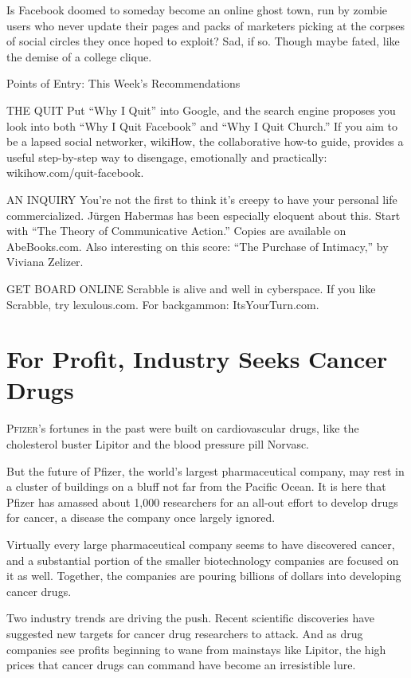 ﻿\documentclass[12pt]{article}
\begin{document}
Is Facebook doomed to someday become an online ghost town, run by zombie users who never update
their pages and packs of marketers picking at the corpses of social circles they once hoped to
exploit? Sad, if so. Though maybe fated, like the demise of a college clique.

Points of Entry: This Week's Recommendations

THE QUIT Put ``Why I Quit'' into Google, and the search engine proposes you look into both ``Why I
Quit Facebook'' and ``Why I Quit Church.'' If you aim to be a lapsed social networker, wikiHow, the
collaborative how-to guide, provides a useful step-by-step way to disengage, emotionally and
practically: wikihow.com/quit-facebook.

AN INQUIRY You're not the first to think it's creepy to have your personal life commercialized.
Jürgen Habermas has been especially eloquent about this. Start with ``The Theory of Communicative
Action.'' Copies are available on AbeBooks.com. Also interesting on this score: ``The Purchase of
Intimacy,'' by Viviana Zelizer.

GET BOARD ONLINE Scrabble is alive and well in cyberspace. If you like Scrabble, try lexulous.com.
For backgammon: ItsYourTurn.com.

\section{For Profit, Industry Seeks Cancer Drugs}

\lettrine{P}{fizer}'s fortunes in the past were built on cardiovascular drugs, like the cholesterol
buster Lipitor and the blood pressure pill Norvasc.

But the future of Pfizer, the world's largest pharmaceutical company, may rest in a cluster of
buildings on a bluff not far from the Pacific Ocean. It is here that Pfizer has amassed about 1,000
researchers for an all-out effort to develop drugs for cancer, a disease the company once largely
ignored.

Virtually every large pharmaceutical company seems to have discovered cancer, and a substantial
portion of the smaller biotechnology companies are focused on it as well. Together, the companies
are pouring billions of dollars into developing cancer drugs.

Two industry trends are driving the push. Recent scientific discoveries have suggested new targets
for cancer drug researchers to attack. And as drug companies see profits beginning to wane from
mainstays like Lipitor, the high prices that cancer drugs can command have become an irresistible
lure.
\end{document}
